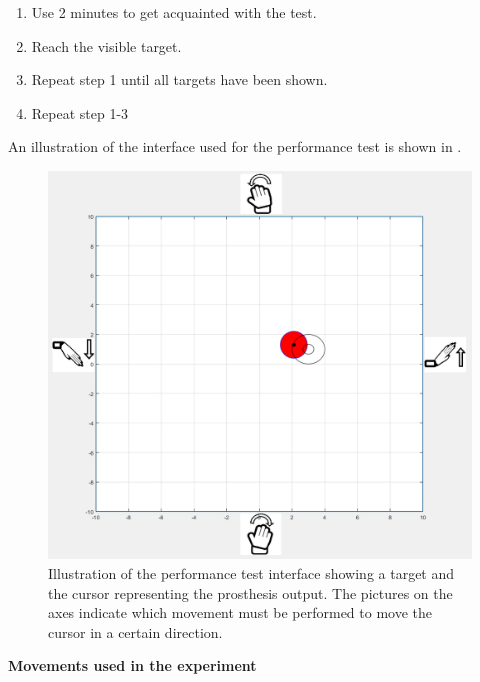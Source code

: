 \begin{enumerate}
	\item Use 2 minutes to get acquainted with the test. 
	\item Reach the visible target.
	\item Repeat step 1 until all targets have been shown.
	\item Repeat step 1-3
\end{enumerate}

An illustration of the interface used for the performance test is shown in .

\begin{figure}[H]                 
	\includegraphics[width=.6\textwidth]{figures/xBackground/perftestGUI}  
	\caption{Illustration of the performance test interface showing a target and the cursor representing the prosthesis output. The pictures on the axes indicate which movement must be performed to move the cursor in a certain direction.}
	\label{fig:perftestGUI} 
\end{figure}

\newpage
\textbf{\Large Movements used in the experiment}

